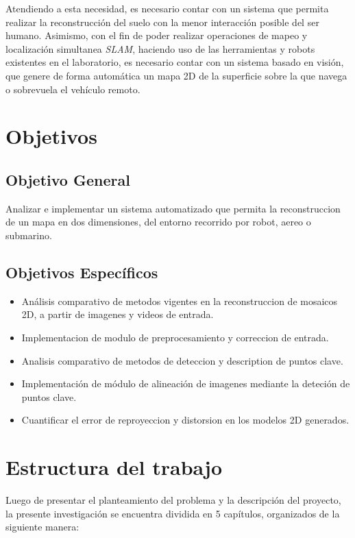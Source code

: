     
Atendiendo a esta necesidad, es necesario contar con un sistema que permita realizar la reconstrucción del suelo con la menor interacción posible del ser humano. Asimismo, con el fin de poder realizar operaciones de mapeo y localización simultanea \textit{SLAM}, haciendo uso de las herramientas y robots existentes en el laboratorio, es necesario contar con un sistema basado en visión, que genere de forma automática un mapa 2D de la superficie sobre la que navega o sobrevuela el vehículo remoto.


\section{Objetivos}

\subsection{Objetivo General}

Analizar e implementar un sistema automatizado que permita la reconstruccion de un mapa en dos dimensiones, del entorno recorrido por robot, aereo o submarino.

\subsection{Objetivos Específicos}

\begin{itemize}
	\item Análisis comparativo de metodos vigentes en la reconstruccion de mosaicos 2D, a partir de imagenes y videos de entrada.
	\item Implementacion de modulo de preprocesamiento y correccion de entrada.
	\item Analisis comparativo de metodos de deteccion y description de puntos clave.
	\item Implementación de módulo de alineación de imagenes mediante la deteción de puntos clave.
	\item Cuantificar el error de reproyeccion y distorsion en los modelos 2D generados.
\end{itemize}

\section{Estructura del trabajo}

Luego de presentar el planteamiento del problema y la descripción del proyecto, la presente investigación se encuentra dividida en 5 capítulos, organizados de la siguiente manera:


